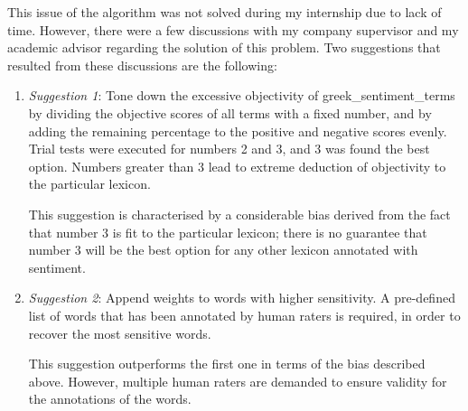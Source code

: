 This issue of the algorithm was not solved during my internship
due to lack of time.
However, there were a few discussions
with my company supervisor and my academic advisor
regarding the solution of this problem.
Two suggestions that resulted from these discussions are the following:

\begin{enumerate}
 \item \emph{Suggestion 1}: Tone down the excessive objectivity
 of greek\_sentiment\_terms
 by dividing the objective scores of all terms with a fixed number,
 and by adding the remaining percentage
 to the positive and negative scores evenly.
 Trial tests were executed for numbers 2 and 3,
 and 3 was found the best option.
 Numbers greater than 3 lead to extreme deduction of objectivity
 to the particular lexicon.
 
 This suggestion is characterised by a considerable bias
 derived from the fact that number 3 is fit to the particular lexicon;
 there is no guarantee that number 3 will be the best option
 for any other lexicon annotated with sentiment.
 
 \item \emph{Suggestion 2}: Append weights to words with higher sensitivity.
 A pre-defined list of words that has been annotated
 by human raters is required,
 in order to recover the most sensitive words.
 
 This suggestion outperforms the first one
 in terms of the bias described above.
 However, multiple human raters are demanded
 to ensure validity for the annotations of the words.
\end{enumerate}

